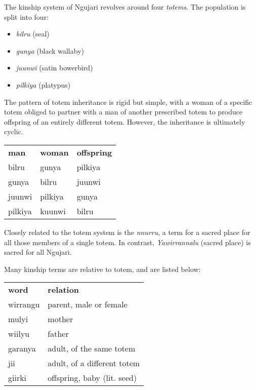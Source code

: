 The kinship system of Ngujari revolves around four \textit{totems}. The population is split into four:
\begin{itemize}
    \item \textit{bilru} (seal)
    \item \textit{gunya} (black wallaby)
    \item \textit{juunwi} (satin bowerbird)
    \item \textit{pilkiya} (platypus)
\end{itemize}

The pattern of totem inheritance is rigid but simple, with a woman of a specific
totem obliged to partner with a man of another prescribed totem to produce
offspring of an entirely different totem. However, the inheritance is ultimately
cyclic.

\begin{table}[h]
\centering
\begin{tabular}{lll}
\textbf{man} & \textbf{woman} & \textbf{offspring} \\
bilru      & gunya   & pilkiya  \\
gunya   & bilru      & juunwi \\
juunwi & pilkiya  & gunya   \\
pilkiya  & kuunwi & bilru\\
\end{tabular}
\end{table}

Closely related to the totem system is the \textit{nnurru}, a term for a sacred
place for all those members of a single totem. In contrast,
\textit{Yawirrannalu} (sacred place) is sacred for all Ngujari.

Many kinship terms are relative to totem, and are listed below:

\begin{table}[h]
\centering
\begin{tabular}{ll}
\textbf{word} & \textbf{relation}\\
wirrangu & parent, male or female\\
mulyi & mother\\
wiilyu & father\\
garanya & adult, of the same totem\\
jii & adult, of a different totem\\
giirki & offspring, baby (lit. seed)\\
\end{tabular}
\end{table}